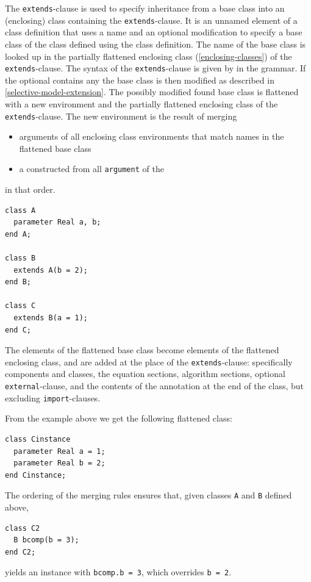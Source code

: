 The \lstinline!extends!-clause is used to specify inheritance from a base class into an (enclosing) class containing the \lstinline!extends!-clause.
It is an unnamed element of a class definition that uses a name and an optional modification to specify a base class of the class defined using the class definition.
The name of the base class is looked up in the partially flattened enclosing class (\cref{enclosing-classes}) of the \lstinline!extends!-clause.
The syntax of the \lstinline!extends!-clause is given by  in the grammar.
If the optional  contains any  the base class is then modified as described in \cref{selective-model-extension}.
The possibly modified found base class is flattened with a new environment and the partially flattened enclosing class of the \lstinline!extends!-clause.
The new environment is the result of merging
\begin{itemize}
\item
  arguments of all enclosing class environments that match names in the flattened base class
\item
  a  constructed from all \lstinline!argument! of the 
\end{itemize}
in that order.


\begin{example}
\begin{lstlisting}[language=modelica]
class A
  parameter Real a, b;
end A;

class B
  extends A(b = 2);
end B;

class C
  extends B(a = 1);
end C;
\end{lstlisting}
\end{example}

The elements of the flattened base class become elements of the flattened enclosing class, and are added at the place of the \lstinline!extends!-clause: specifically components and classes, the equation sections, algorithm sections, optional \lstinline!external!-clause, and the contents of the annotation at the end of the class, but excluding \lstinline!import!-clauses.

\begin{nonnormative}
From the example above we get the following flattened class:
\begin{lstlisting}[language=modelica]
class Cinstance
  parameter Real a = 1;
  parameter Real b = 2;
end Cinstance;
\end{lstlisting}

The ordering of the merging rules ensures that, given classes \lstinline!A! and \lstinline!B! defined above,
\begin{lstlisting}[language=modelica]
class C2
  B bcomp(b = 3);
end C2;
\end{lstlisting}
yields an instance with \lstinline!bcomp.b = 3!, which overrides \lstinline!b = 2!.
\end{nonnormative}

